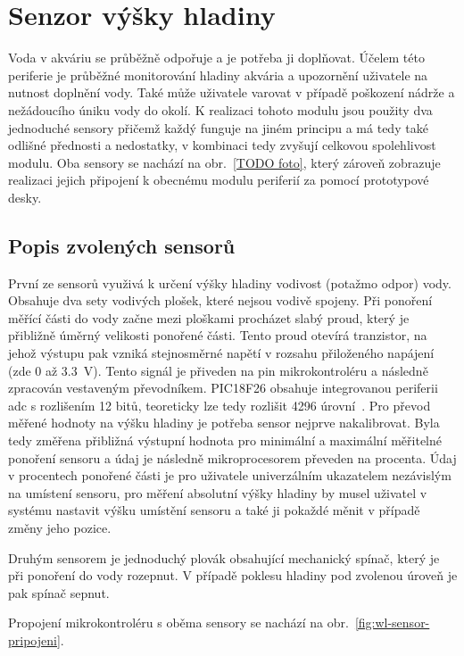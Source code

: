 \section{Senzor výšky hladiny}
\label{sec:perif-sensor-hladina}
    Voda v akváriu se průběžně odpořuje a je potřeba ji doplňovat. Účelem této periferie je průběžné monitorování hladiny akvária a upozornění uživatele na nutnost doplnění vody. Také může uživatele varovat v případě poškození nádrže a nežádoucího úniku vody do okolí. 
    K realizaci tohoto modulu jsou použity dva jednoduché sensory přičemž každý funguje na jiném principu a má tedy také odlišné přednosti a nedostatky, v kombinaci tedy zvyšují celkovou spolehlivost modulu. Oba sensory se nachází na obr.~\ref{TODO foto}, který zároveň zobrazuje realizaci jejich připojení k obecnému modulu periferií za pomocí prototypové desky. 

    \subsection{Popis zvolených sensorů}
    První ze sensorů využivá k určení výšky hladiny vodivost (potažmo odpor) vody. Obsahuje dva sety vodivých plošek, které nejsou vodivě spojeny. Při ponoření měřící části do vody začne mezi ploškami procházet slabý proud, který je přibližně úměrný velikosti ponořené části. Tento proud otevírá tranzistor, na jehož výstupu pak vzniká stejnosměrné napětí v rozsahu přiloženého napájení (zde 0 až \qty{3.3}{V}). Tento signál je přiveden na pin mikrokontroléru a následně zpracován vestaveným převodníkem. PIC18F26 obsahuje integrovanou periferii \acs{adc} s rozlišením 12 bitů, teoreticky lze tedy rozlišit \num{4296} úrovní~\cite{PIC18F26Q83}. Pro převod měřené hodnoty na výšku hladiny je potřeba sensor nejprve nakalibrovat. Byla tedy změřena přibližná výstupní hodnota pro minimální a maximální měřitelné ponoření sensoru a údaj je následně mikroprocesorem převeden na procenta. Údaj v procentech ponořené části je pro uživatele univerzálním ukazatelem nezávislým na umístení sensoru, pro měření absolutní výšky hladiny by musel uživatel v systému nastavit výšku umístění sensoru a také ji pokaždé měnit v případě změny jeho pozice.

    Druhým sensorem je jednoduchý plovák obsahující mechanický spínač, který je při ponoření do vody rozepnut. V případě poklesu hladiny pod zvolenou úroveň je pak spínač sepnut.

    Propojení mikrokontroléru s oběma sensory se nachází na obr.~\ref{fig:wl-sensor-pripojeni}.

